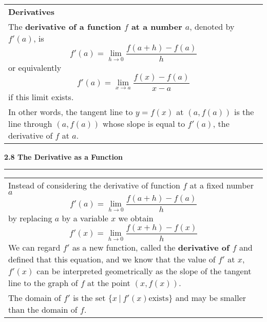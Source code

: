 \documentclass[fleqn]{article}
\begin{document}
\begin{center}
\def\arraystretch{1.3}
{\setlength{\tabcolsep}{16pt}
\begin{tabularx}{.9\textwidth}{|X|}
\hline
	\vspace{1pt}
	\textbf{Derivatives} \\
	The \textbf{derivative of a function $f$ at a number $a$}, denoted by $f'(a)$, is
	$$f'(a) = \underset{h \to 0}{\lim} \dfrac{f(a+h) - f(a)}{h}$$
	or equivalently
	$$f'(a) = \underset{x \to a}{\lim} \dfrac{f(x) - f(a)}{x-a}$$
	if this limit exists. \\
	In other words, the tangent line to $y=f(x)$ at $(a, f(a))$ is the line through $(a, f(a))$ whose slope is equal to $f'(a)$, the derivative of $f$ at $a$.
	\\[16pt]
	\hline
\end{tabularx}}
\vspace{32pt}

\Large\textbf{2.8 The Derivative as a Function}

\noindent\hfill\rule{0.3\textwidth}{.4pt}\hfill
\vspace{12pt}

\large
\def\arraystretch{1.3}
{\setlength{\tabcolsep}{16pt}
\begin{tabularx}{.9\textwidth}{|X|}
\hline
	\vspace{1pt}
	Instead of considering the derivative of function $f$ at a fixed number $a$
	$$f'(a) = \underset{h \to 0}{\lim} \dfrac{f(a+h) - f(a)}{h}$$
	by replacing $a$ by a variable $x$ we obtain
	$$f'(x) = \underset{h \to 0}{\lim} \dfrac{f(x+h) - f(x)}{h}$$
	We can regard $f'$ as a new function, called the \textbf{derivative of $f$} and defined that this equation, and we know that the value of $f'$ at $x$, $f'(x)$ can be interpreted geometrically as the slope of the tangent line to the graph of $f$ at the point $(x, f(x))$.\\[5pt]
	The domain of $f'$ is the set $\{x \: | \: f'(x) \text{exists}\}$ and may be smaller than the domain of $f$.
	\\[16pt]
	\hline
\end{tabularx}}
\vspace{12pt}


\end{center}
\end{document}
